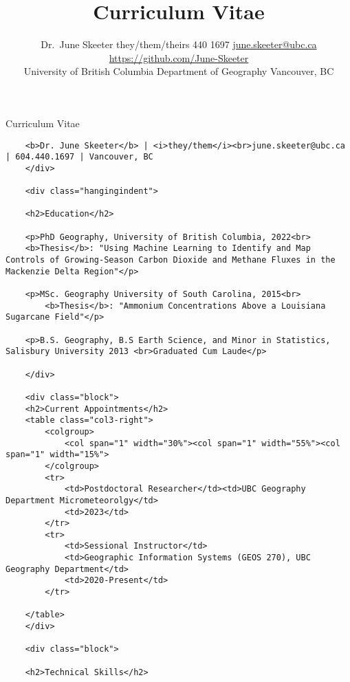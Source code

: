 \documentclass[
]{article}
\title{ \vspace{-1.5em}
\bf Curriculum Vitae \vspace{-.5em}
}
\author{
      {Dr.~June Skeeter 
    \authorcr %
    they/them/theirs
    \authorcr
    604 440 1697
    \authorcr
    \href{mailto:june.skeeter@ubc.ca}{june.skeeter@ubc.ca}}
    \authorcr
    \href{https://github.com/June-Skeeter}{https://github.com/June-Skeeter}
    

          University of British Columbia
      \authorcr
      Department of Geography
      \authorcr
      Vancouver, BC 
      }
\date{}
\begin{document}
\maketitle
\ifdefined\Shaded\renewenvironment{Shaded}{\begin{tcolorbox}[frame hidden, interior hidden, borderline west={3pt}{0pt}{shadecolor}, enhanced, breakable, boxrule=0pt, sharp corners]}{\end{tcolorbox}}\fi

Curriculum Vitae

\begin{verbatim}
    <b>Dr. June Skeeter</b> | <i>they/them</i><br>june.skeeter@ubc.ca | 604.440.1697 | Vancouver, BC
    </div>
    
    <div class="hangingindent">
        
    <h2>Education</h2>
    
    <p>PhD Geography, University of British Columbia, 2022<br>
    <b>Thesis</b>: "Using Machine Learning to Identify and Map Controls of Growing-Season Carbon Dioxide and Methane Fluxes in the Mackenzie Delta Region"</p>
    
    <p>MSc. Geography University of South Carolina, 2015<br>
        <b>Thesis</b>: "Ammonium Concentrations Above a Louisiana Sugarcane Field"</p>
    
    <p>B.S. Geography, B.S Earth Science, and Minor in Statistics, Salisbury University 2013 <br>Graduated Cum Laude</p>
    
    </div>
    
    <div class="block">
    <h2>Current Appointments</h2>
    <table class="col3-right">
        <colgroup>
            <col span="1" width="30%"><col span="1" width="55%"><col span="1" width="15%">
        </colgroup>
        <tr>
            <td>Postdoctoral Researcher</td><td>UBC Geography Department Micrometeorolgy</td>
            <td>2023</td>
        </tr>
        <tr>
            <td>Sessional Instructor</td>
            <td>Geographic Information Systems (GEOS 270), UBC Geography Department</td>
            <td>2020-Present</td>
        </tr>
    
    </table>
    </div>
    
    <div class="block">
    
    <h2>Technical Skills</h2>
    

\end{verbatim}
\end{document}
